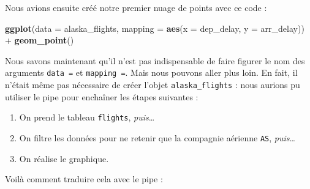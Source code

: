 \documentclass[a4paperpaper,]{article}
\newenvironment{Shaded}{\begin{snugshade}}{\end{snugshade}}
\newcommand{\DataTypeTok}[1]{\textcolor[rgb]{0.00,0.34,0.68}{#1}}
\newcommand{\KeywordTok}[1]{\textcolor[rgb]{0.12,0.11,0.11}{\textbf{#1}}}
\newcommand{\NormalTok}[1]{\textcolor[rgb]{0.12,0.11,0.11}{#1}}
\newcommand{\OperatorTok}[1]{\textcolor[rgb]{0.12,0.11,0.11}{#1}}
\newcommand{\StringTok}[1]{\textcolor[rgb]{0.75,0.01,0.01}{#1}}
\providecommand{\tightlist}{%
  \setlength{\itemsep}{0pt}\setlength{\parskip}{0pt}}
\begin{document}
Nous avions ensuite créé notre premier nuage de points avec ce code :

\begin{Shaded}
\begin{Highlighting}[]
\KeywordTok{ggplot}\NormalTok{(}\DataTypeTok{data =}\NormalTok{ alaska_flights, }\DataTypeTok{mapping =} \KeywordTok{aes}\NormalTok{(}\DataTypeTok{x =}\NormalTok{ dep_delay, }\DataTypeTok{y =}\NormalTok{ arr_delay)) }\OperatorTok{+}\StringTok{ }
\StringTok{  }\KeywordTok{geom_point}\NormalTok{()}
\end{Highlighting}
\end{Shaded}

Nous savons maintenant qu'il n'est pas indispensable de faire figurer le nom des arguments \texttt{data\ =} et \texttt{mapping\ =}. Mais nous pouvons aller plus loin. En fait, il n'était même pas nécessaire de créer l'objet \texttt{alaska\_flights} : nous aurions pu utiliser le pipe pour enchaîner les étapes suivantes :

\begin{enumerate}
\def\labelenumi{\arabic{enumi}.}
\tightlist
\item
  On prend le tableau \texttt{flights}, \emph{puis}\ldots{}
\item
  On filtre les données pour ne retenir que la compagnie aérienne \texttt{AS}, \emph{puis}\ldots{}
\item
  On réalise le graphique.
\end{enumerate}

Voilà comment traduire cela avec le pipe :

\begin{Shaded}
\end{Shaded}
\end{document}
